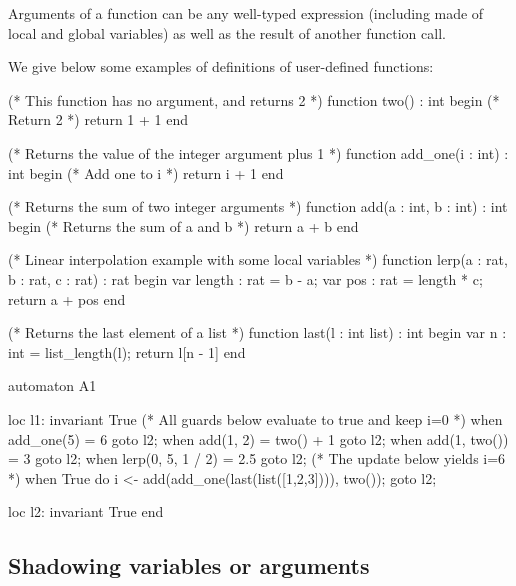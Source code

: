 Arguments of a function can be any well-typed expression (including made of local and global variables) as well as the result of another function call.

\begin{example}
We give below some examples of definitions of user-defined functions:

\begin{IMITATORmodel}
(* This function has no argument, and returns 2 *)
function two() : int
begin
	(* Return 2 *)
	return 1 + 1
end

(* Returns the value of the integer argument plus 1 *)
function add_one(i : int) : int
begin
	(* Add one to i *)
	return i + 1
end

(* Returns the sum of two integer arguments *)
function add(a : int, b : int) : int
begin
	(* Returns the sum of a and b *)
	return a + b
end

(* Linear interpolation example with some local variables *)
function lerp(a : rat, b : rat, c : rat) : rat
begin
	var length : rat = b - a;
	var pos : rat = length * c;
	return a + pos
end

(* Returns the last element of a list *)
function last(l : int list) : int
begin
	var n : int = list_length(l);
	return l[n - 1]
end

automaton A1

loc l1: invariant True
	(* All guards below evaluate to true and keep i=0 *)
	when add_one(5) = 6                                            goto l2;
	when add(1, 2) = two() + 1                                     goto l2;
	when add(1, two()) = 3                                         goto l2;
	when lerp(0, 5, 1 / 2) = 2.5                                   goto l2;
	(* The update below yields i=6 *)
	when True do {i <- add(add_one(last(list([1,2,3]))), two()); } goto l2;

loc l2: invariant True
end
\end{IMITATORmodel}
\end{example}


\subsection{Shadowing variables or arguments}

